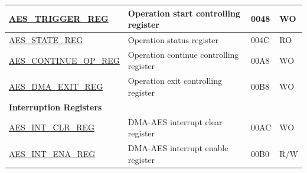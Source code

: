\begin{longtable}{ | p{5.2cm} | p{6.6cm} | p{2cm} | p{1.2cm} | }
\hyperref[regdesc:AESTRIGGERREG]{AES\_TRIGGER\_REG}			&	Operation start controlling register		& \hexprefix{}0048 & WO \\ \hline
\hyperref[regdesc:AESSTATEREG]{AES\_STATE\_REG}				&	Operation status register			& \hexprefix{}004C & RO \\ \hline
\hyperref[regdesc:AESCONTINUEOPREG]{AES\_CONTINUE\_OP\_REG} & Operation continue controlling register & \hexprefix{}00A8 & WO \\ \hline
\hyperref[regdesc:AESDMAEXITREG]{AES\_DMA\_EXIT\_REG}		&	Operation exit controlling register	& \hexprefix{}00B8 & WO \\ \hline

\multicolumn{4}{|l|}{\textbf{Interruption Registers}} \\ \hline

\hyperref[regdesc:AESINTCLRREG]{AES\_INT\_CLR\_REG}			&	DMA-AES interrupt clear register	& \hexprefix{}00AC & WO \\ \hline
\hyperref[regdesc:AESINTENAREG]{AES\_INT\_ENA\_REG}			&	DMA-AES interrupt enable register	& \hexprefix{}00B0 & R/W \\ \hline

\end{longtable}
